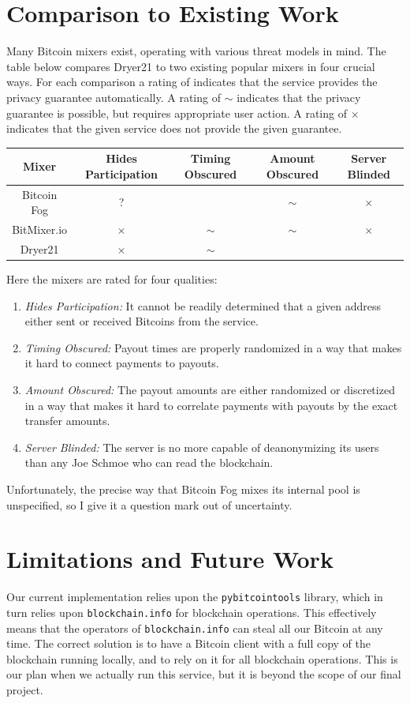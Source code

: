 \documentclass[12pt]{article}
\newcommand{\sw}[1]{\footnotesize{}#1}
\newcommand{\cmark}{\checkmark}
\newcommand{\xmark}{$\times$}
\begin{document}
\section{Comparison to Existing Work}
Many Bitcoin mixers exist, operating with various threat models in mind.
The table below compares Dryer21 to two existing popular mixers in four crucial ways.
For each comparison a rating of \cmark{} indicates that the service provides the privacy guarantee automatically.
A rating of $\sim$ indicates that the privacy guarantee is possible, but requires appropriate user action.
A rating of \xmark{} indicates that the given service does not provide the given guarantee.
\begin{center}
\begin{tabular}{c|c|c|c|c}
Mixer       & \sw{Hides Participation} & \sw{Timing Obscured} & \sw{Amount Obscured} & \sw{Server Blinded} \\\hline
Bitcoin Fog & ? & \cmark & $\sim$ & \xmark \\\hline
BitMixer.io & \xmark & $\sim$ & $\sim$ & \xmark \\\hline
Dryer21     & \xmark & $\sim$ & \cmark & \cmark
\end{tabular}
\end{center}
Here the mixers are rated for four qualities:
\begin{enumerate}
\item \emph{Hides Participation:} It cannot be readily determined that a given address either sent or received Bitcoins from the service.
\item \emph{Timing Obscured:} Payout times are properly randomized in a way that makes it hard to connect payments to payouts.
\item \emph{Amount Obscured:} The payout amounts are either randomized or discretized in a way that makes it hard to correlate payments with payouts by the exact transfer amounts.
\item \emph{Server Blinded:} The server is no more capable of deanonymizing its users than any Joe Schmoe who can read the blockchain.
\end{enumerate}
Unfortunately, the precise way that Bitcoin Fog mixes its internal pool is unspecified, so I give it a question mark out of uncertainty.

\section{Limitations and Future Work}
Our current implementation relies upon the \texttt{pybitcointools} library, which in turn relies upon \texttt{blockchain.info} for blockchain operations.
This effectively means that the operators of \texttt{blockchain.info} can steal all our Bitcoin at any time.
The correct solution is to have a Bitcoin client with a full copy of the blockchain running locally, and to rely on it for all blockchain operations.
This is our plan when we actually run this service, but it is beyond the scope of our final project.
\end{document}

